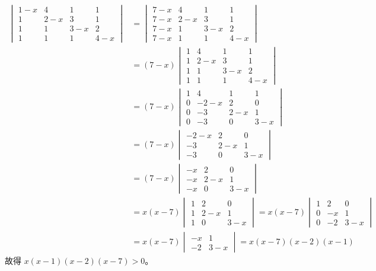 \begin{align*}
\begin{vmatrix}
1-x & 4 & 1 & 1 \\
1 & 2-x & 3 & 1 \\
1 & 1 & 3-x & 2 \\
1 & 1 & 1 & 4-x
\end{vmatrix}
&= \begin{vmatrix}
7-x & 4 & 1 & 1 \\
7-x & 2-x & 3 & 1 \\
7-x & 1 & 3-x & 2 \\
7-x & 1 & 1 & 4-x
\end{vmatrix} \\
&= (7-x) \begin{vmatrix}
1 & 4 & 1 & 1 \\
1 & 2-x & 3 & 1 \\
1 & 1 & 3-x & 2 \\
1 & 1 & 1 & 4-x
\end{vmatrix} \\
&= (7-x) \begin{vmatrix}
1 & 4 & 1 & 1 \\
0 & -2-x & 2 & 0 \\
0 & -3 & 2-x & 1 \\
0 & -3 & 0 & 3-x
\end{vmatrix} \\
&= (7-x) \begin{vmatrix}
-2-x & 2 & 0 \\
-3 & 2-x & 1 \\
-3 & 0 & 3-x
\end{vmatrix} \\
&= (7-x) \begin{vmatrix}
-x & 2 & 0 \\
-x & 2-x & 1 \\
-x & 0 & 3-x
\end{vmatrix} \\
&= x(x-7) \begin{vmatrix}
1 & 2 & 0 \\
1 & 2-x & 1 \\
1 & 0 & 3-x
\end{vmatrix} = x(x-7) \begin{vmatrix}
1 & 2 & 0 \\
0 & -x & 1 \\
0 & -2 & 3-x
\end{vmatrix} \\
&= x(x-7) \begin{vmatrix}
-x & 1 \\
-2 & 3-x
\end{vmatrix} = x(x-7)(x-2)(x-1)
\end{align*}
故得 $x(x-1)(x-2)(x-7) > 0$。

